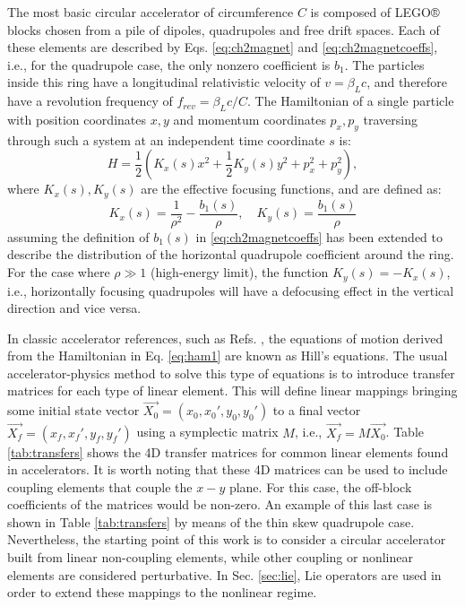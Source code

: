 The most basic circular accelerator of circumference $C$ is composed of LEGO® blocks chosen from a pile of dipoles, quadrupoles and free drift spaces. Each of these elements are described by Eqs. \ref{eq:ch2magnet} and \ref{eq:ch2magnetcoeffs}, i.e., for the quadrupole case, the only nonzero coefficient is $b_1$. The particles inside this ring have a longitudinal relativistic velocity of $v=\beta_L c$, and therefore have a revolution frequency of $f_{rev}=\beta_L c/C$. The Hamiltonian of a single particle with position coordinates $x,y$ and momentum coordinates $p_x,p_y$ traversing through such a system at an independent time coordinate $s$ is:
\begin{equation}
    \label{eq:ham1}
    H=\frac{1}{2}\left( K_x(s)x^2+ \frac{1}{2}K_y(s)y^2+ p_x^2 + p_y^2\right),
\end{equation}
where $K_x(s),K_y(s)$ are the effective focusing functions, and are defined as:
\begin{equation}
    \label{eq:kx}
    K_x(s)=\frac{1}{\rho^2}-\frac{b_1(s)}{\rho}, \quad K_y(s)=\frac{b_1(s)}{\rho}
\end{equation}
assuming the definition of $b_1(s)$ in \ref{eq:ch2magnetcoeffs} has been extended to describe the distribution of the horizontal quadrupole coefficient around the ring. For the case where $\rho\gg 1$ (high-energy limit), the function $K_y(s)=-K_x(s)$, i.e., horizontally focusing quadrupoles will have a defocusing effect in the vertical direction and vice versa. 

In classic accelerator references, such as Refs. \cite{sylee,wolski,Wiedemann2015}, the equations of motion derived from the Hamiltonian in Eq. \ref{eq:ham1} are known as Hill's equations. The usual accelerator-physics method to solve this type of equations is to introduce transfer matrices for each type of linear element. This will define linear mappings bringing some initial state vector $\vec{X_0} = \left( x_0,x_0',y_0,y_0' \right)$ to a final vector $\vec{X_f} = \left( x_f,x_f',y_f,y_f' \right)$ using a symplectic matrix $M$, i.e., $\vec{X_f}=M\vec{X_0}$. Table \ref{tab:transfers} shows the 4D transfer matrices for common linear elements found in accelerators. It is worth noting that these 4D matrices can be used to include coupling elements that couple the $x-y$ plane. For this case, the off-block coefficients of the matrices would be non-zero. An example of this last case is shown in Table \ref{tab:transfers} by means of the thin skew quadrupole case. Nevertheless, the starting point of this work is to consider a circular accelerator built from linear non-coupling elements, while other coupling or nonlinear elements are considered perturbative. In Sec. \ref{sec:lie}, Lie operators are used in order to extend these mappings to the nonlinear regime.     

